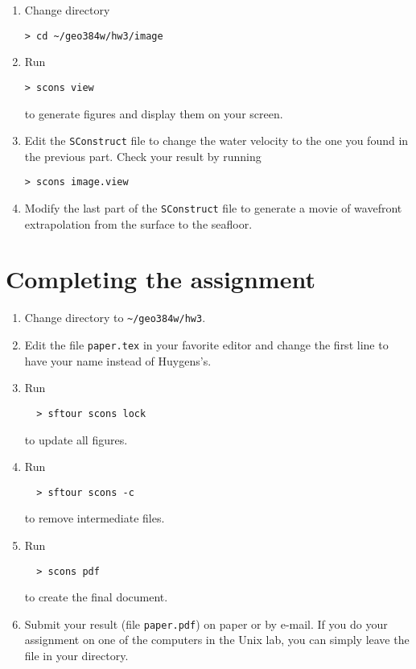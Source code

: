 \begin{enumerate}
\begin{enumerate}
\item Change directory 
\begin{verbatim}
> cd ~/geo384w/hw3/image
\end{verbatim}
\item Run
\begin{verbatim}
> scons view
\end{verbatim}
to generate figures and display them on your screen.  
\item Edit the
\texttt{SConstruct} file to change the water velocity to the one you found in the previous part.
Check your result by running
\begin{verbatim}
> scons image.view
\end{verbatim}
\item Modify the last part of the \texttt{SConstruct} file to generate a movie of wavefront extrapolation 
from the surface to the seafloor.
\end{enumerate}

{\small }

\end{enumerate}

\section{Completing the assignment}

\begin{enumerate}
\item Change directory to \verb#~/geo384w/hw3#.
\item Edit the file \texttt{paper.tex} in your favorite editor and change the
  first line to have your name instead of Huygens's.
\item Run
\begin{verbatim}
  > sftour scons lock
\end{verbatim}
to update all figures.
\item Run
\begin{verbatim}
  > sftour scons -c
\end{verbatim}
  to remove intermediate files.
\item Run
 \begin{verbatim} 
  > scons pdf
\end{verbatim}
  to create the final document.
\item Submit your result (file \texttt{paper.pdf}) on paper or by
  e-mail. If you do your assignment on one of the computers in the
  Unix lab, you can simply leave the file in your directory.
\end{enumerate}

 

